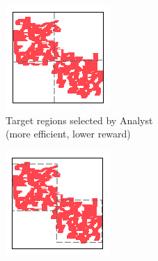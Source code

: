 \documentclass{tamuccthesis}
\begin{document}
\begin{figure}[H]
    \centering
    \begin{subfigure}[b]{0.475\textwidth}
        \centering
        \includegraphics[width=\textwidth]{quadtree_exA.png}
        \caption{Target regions selected by Analyst \\ (more efficient, lower reward)}    
        \label{fig:quadtree_a}
    \end{subfigure}
    \hfill
    \begin{subfigure}[b]{0.475\textwidth}  
        \centering 
        \includegraphics[width=\textwidth]{quadtree_exB.png}

\end{subfigure}
\end{figure}
\end{document}
